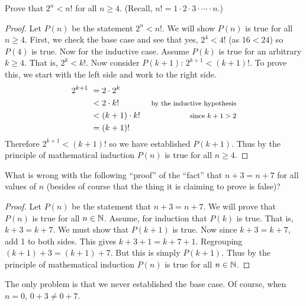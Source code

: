 \begin{questions}
	
	

\question Prove that $2^n < n!$ for all $n \ge 4$.  (Recall, $n! = 1\cdot 2 \cdot 3 \cdot \cdots\cdot n$.)

	\begin{answer}
		\begin{proof}
		 Let $P(n)$ be the statement $2^n < n!$.  We will show $P(n)$ is true for all $n \ge 4$.  First, we check the base case and see that yes, $2^4 < 4!$ (as $16 < 24$) so $P(4)$ is true.  Now for the inductive case.  Assume $P(k)$ is true for an arbitrary $k \ge 4$.  That is, $2^k < k!$.  Now consider $P(k+1)$: $2^{k+1} < (k+1)!$.  To prove this, we start with the left side and work to the right side.
		 \begin{align*}
		  2^{k+1}~ & = 2\cdot 2^k & \\
		  & < 2\cdot k! & \mbox{ \footnotesize by the inductive hypothesis}\\
		  & < (k+1) \cdot k! & \mbox{ \footnotesize since $k+1 > 2$}\\
		  & = (k+1)! &
		 \end{align*}
		Therefore $2^{k+1} < (k+1)!$ so we have established $P(k+1)$.  Thus by the principle of mathematical induction $P(n)$ is true for all $n \ge 4$.
		\end{proof}
	\end{answer}
	
	
	


\question What is wrong with the following ``proof'' of the ``fact'' that $n+3 = n+7$ for all values of $n$ (besides of course that the thing it is claiming to prove is false)? 
  \begin{proof}
    Let $P(n)$ be the statement that $n + 3 = n + 7$.  We will prove that $P(n)$ is true for all $n \in \mathbb N$.  Assume, for induction that $P(k)$ is true.  That is, $k+3 = k+7$.  We must show that $P(k+1)$ is true.  Now since $k + 3 = k + 7$, add 1 to both sides.  This gives $k + 3 + 1 = k + 7 + 1$.  Regrouping $(k+1) + 3 = (k+1) + 7$.  But this is simply $P(k+1)$.  Thus by the principle of mathematical induction $P(n)$ is true for all $n \in \mathbb N$.
  \end{proof}
  
  	\begin{answer}
  		The only problem is that we never established the base case.  Of course, when $n = 0$, $0+3 \ne 0+7$.
  	\end{answer}
  	
  	
  	

\end{questions}
